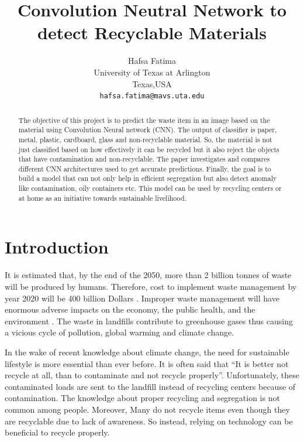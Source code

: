 \documentclass[10pt,twocolumn,letterpaper]{article}
\begin{document}
\title{Convolution Neutral Network to detect Recyclable Materials}

\author{Hafsa Fatima\\
University of Texas at Arlington\\
Texas,USA\\
{\tt\small hafsa.fatima@mavs.uta.edu}
}

\maketitle

\begin{abstract}
The objective of this project is to predict the waste item in an image based on the material using Convolution Neural network (CNN). The output of classifier is paper, metal, plastic, cardboard, glass and non-recyclable material. So, the material is not just classified based on how effectively it can be recycled but it also reject the objects that have contamination and non-recyclable. The paper investigates and compares different CNN architectures used to get accurate predictions.  Finally, the goal is to build a model that can not only help in efficient segregation but also detect anomaly like contamination, oily containers etc. This model can be used by recycling centers or at home as an initiative towards sustainable livelihood.
\end{abstract}
\section{Introduction}
It is estimated that, by the end of the 2050, more than 2 billion tonnes of waste will be produced by humans. Therefore, cost to implement waste management by year 2020 will be 400 billion Dollars . Improper waste management will have enormous adverse impacts on the economy, the public health, and the environment \cite{1}. The waste in landfills contribute to greenhouse gases thus causing a vicious cycle of pollution, global warming and climate change.

In the wake of recent knowledge about climate change, the need for sustainable lifestyle is more essential than ever before. It is often said that “It is better not recycle at all, than to contaminate and not recycle properly”. Unfortunately, these contaminated loads are sent to the landfill instead of recycling centers because of contamination. The knowledge about proper recycling and segregation is not common among people. Moreover, Many do not recycle items even though they are recyclable due to lack of awareness. So instead, relying on technology can be beneficial to  recycle properly.
\end{document}
